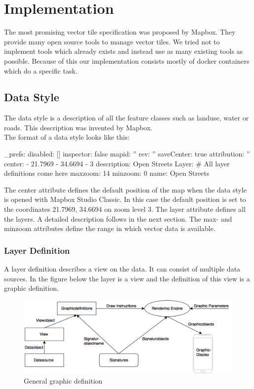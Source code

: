 \chapter{Implementation}\label{implementation}

The most promising vector tile specification was proposed by Mapbox.
They provide many open source tools to manage vector tiles. We tried not to implement tools which already exists and instead use as many existing tools as possible. Because of this our implementation consists mostly of docker containers which do a specific task.

\section{Data Style}\label{data_style}

The data style is a description of all the feature classes such as landuse, water or roads. This description was invented by Mapbox.
\\
The format of a data style looks like this:
\begin{yamlcode}
_prefs: 
  disabled: []
  inspector: false
  mapid: ''
  rev: ''
  saveCenter: true
attribution: ''
center: 
  - 21.7969
  - 34.6694
  - 3
description: Open Streets
Layer: 
    # All layer definitions come here
maxzoom: 14
minzoom: 0
name: Open Streets
\end{yamlcode}
The center attribute defines the default position of the map when the data style is opened with Mapbox Studio Classic. In this case the default position is set to the coordinates 21.7969, 34.6694 on zoom level 3. The layer attribute defines all the layers. A detailed description follows in the next section. The max- and minzoom attributes define the range in which vector data is available.
\newpage
\subsection{Layer Definition}\label{layer_definition}
A layer definition describes a view on the data. It can consist of multiple data sources. In the figure below the layer is a view and the definition of this view is a graphic definition.

\begin{figure}[h]
  \centering
  \includegraphics[width=1\textwidth]{images/graphic_definition.png}
  \caption{General graphic definition}
\end{figure}

